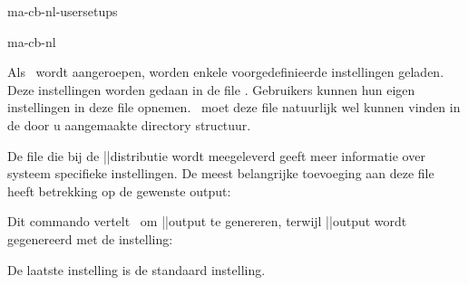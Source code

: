\startonderdeel ma-cb-nl-usersetups

\produkt ma-cb-nl


Als \CONTEXT\ wordt aangeroepen, worden enkele
voorgedefinieerde instellingen geladen. Deze instellingen
worden gedaan in de file . Gebruikers
kunnen hun eigen instellingen in deze file opnemen.
\CONTEXT\ moet deze file natuurlijk wel kunnen vinden in de
door u aangemaakte directory structuur.

De  file die bij de \CONTEXT||distributie wordt
meegeleverd geeft meer informatie over systeem specifieke
instellingen. De meest belangrijke toevoeging aan deze file
heeft betrekking op de gewenste output:

\starttypen
\steluitvoerin[pdftex]
\stoptypen

Dit commando vertelt \CONTEXT\ om \PDF||output te genereren,
terwijl \DVI||output wordt gegenereerd met de instelling:

\starttypen
{}
\stoptypen

De laatste instelling is de standaard instelling.

\stoponderdeel
